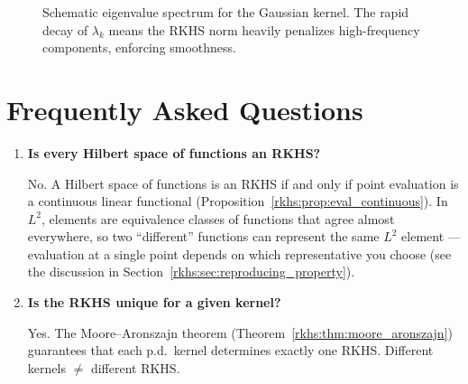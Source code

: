 \begin{notechapter}
\begin{figure}[h]
\caption{Schematic eigenvalue spectrum for the Gaussian kernel. The
rapid decay of $\lambda_k$ means the RKHS norm heavily penalizes
high-frequency components, enforcing smoothness.}
\label{rkhs:fig:mercer_eigenvalues}
\end{figure}

\section{Frequently Asked Questions}
\label{rkhs:sec:faq}

\begin{enumerate}[label=\textbf{Q\arabic*.}, leftmargin=*, itemsep=10pt]

\item \textbf{Is every Hilbert space of functions an RKHS?}

No. A Hilbert space of functions is an RKHS if and only
if point evaluation is a continuous linear functional
(Proposition~\ref{rkhs:prop:eval_continuous}). In $L^2$,
elements are equivalence classes of functions that
agree almost everywhere, so two ``different'' functions
can represent the same $L^2$ element --- evaluation at
a single point depends on which representative you
choose (see the discussion in
Section~\ref{rkhs:sec:reproducing_property}).

\item \textbf{Is the RKHS unique for a given kernel?}

Yes. The Moore--Aronszajn theorem (Theorem~\ref{rkhs:thm:moore_aronszajn})
guarantees that each p.d.\ kernel determines exactly one RKHS. Different
kernels $\neq$ different RKHS.


\end{enumerate}
\end{notechapter}
